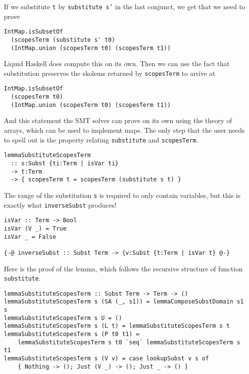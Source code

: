 \documentclass[sigconf, anonymous, review]{acmart}
\newcommand{\tc}[1]{{\small\texttt{#1}}}
\begin{document}
If we substitute \tc{t} by \tc{substitute s'} in the last conjunct, we get that we
need to prove

\begin{verbatim}
IntMap.isSubsetOf
  (scopesTerm (substitute s' t0)
  (IntMap.union (scopesTerm t0) (scopesTerm t1))
\end{verbatim}

Liquid Haskell does compute this on its own. Then we can use the fact that substitution
preserves the skolems returned by \tc{scopesTerm} to arrive at

\begin{verbatim}
IntMap.isSubsetOf
  (scopesTerm t0)
  (IntMap.union (scopesTerm t0) (scopesTerm t1))
\end{verbatim}

And this statement the SMT solver can prove on its own using the theory of arrays,
which can be used to implement maps. The only step that the user needs to spell out
is the property relating \tc{substitute} and \tc{scopesTerm}.

\begin{verbatim}
lemmaSubstituteScopesTerm
  :: s:Subst {ti:Term | isVar ti}
  -> t:Term
  -> { scopesTerm t = scopesTerm (substitute s t) }
\end{verbatim}

The range of the substitution \tc{s} is required to only contain variables, but
this is exactly what \tc{inverseSubst} produces!

\begin{verbatim}
isVar :: Term -> Bool
isVar (V _) = True
isVar _ = False

{-@ inverseSubst :: Subst Term -> {v:Subst {t:Term | isVar t} @-}
\end{verbatim}

Here is the proof of the lemma, which follows the recursive structure
of function \tc{substitute}.

\begin{verbatim}
lemmaSubstituteScopesTerm :: Subst Term -> Term -> ()
lemmaSubstituteScopesTerm s (SA (_, s1)) = lemmaComposeSubstDomain s1 s
lemmaSubstituteScopesTerm s U = ()
lemmaSubstituteScopesTerm s (L t) = lemmaSubstituteScopesTerm s t
lemmaSubstituteScopesTerm s (P t0 t1) =
    lemmaSubstituteScopesTerm s t0 `seq` lemmaSubstituteScopesTerm s t1
lemmaSubstituteScopesTerm s (V v) = case lookupSubst v s of
    { Nothing -> (); Just (V _) -> (); Just _ -> () }
\end{verbatim}
\end{document}
